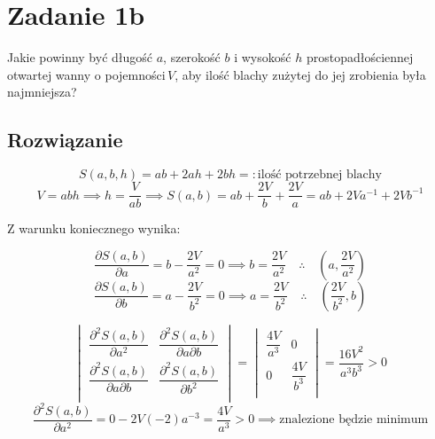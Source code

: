 \documentclass{article}
\newcommand{\partderiv}[2]{\frac{\partial #1}{\partial #2}}
\DeclareMathOperator{\?}{?}
\begin{document}
\section*{Zadanie 1b}
Jakie powinny być długość $a$, szerokość $b$ i wysokość $h$ prostopadłościennej
otwartej wanny o pojemności\,$V$, aby ilość blachy zużytej do jej zrobienia była
najmniejsza?

\subsection*{Rozwiązanie}

\begin{equation*}
   S(a,b,h) = ab + 2ah + 2bh =: \textrm{ilość potrzebnej blachy}
\end{equation*}
\begin{equation*}
   V = abh \implies h = \frac{V}{ab} \implies S(a,b) = ab + \frac{2V}{b} + \frac{2V}{a} = ab + 2Va^{-1} + 2Vb^{-1}
\end{equation*}

Z warunku koniecznego wynika:

\begin{equation} \label{a}
   \partderiv{S(a,b)}{a} = b - \frac{2V}{a^2} = 0 \implies b = \frac{2V}{a^2} \quad\therefore\quad \left( a, \frac{2V}{a^2} \right)
\end{equation}
\begin{equation} \label{b}
   \partderiv{S(a,b)}{b} = a - \frac{2V}{b^2} = 0 \implies a = \frac{2V}{b^2} \quad\therefore\quad \left( \frac{2V}{b^2}, b \right)
\end{equation}

\begin{equation*}
   \begin{vmatrix}
      \dfrac{\partial^2 S(a,b)}{\partial a^2} & \dfrac{\partial^2 S(a,b)}{\partial a \partial b} \\[1em]
      \dfrac{\partial^2 S(a,b)}{\partial a \partial b} & \dfrac{\partial^2 S(a,b)}{\partial b^2} \\
   \end{vmatrix}
   =
   \begin{vmatrix}
      \dfrac{4V}{a^3} & 0 \\[1em]
      0 & \dfrac{4V}{b^3} \\
   \end{vmatrix}
   = \frac{16V^2}{a^3 b^3} > 0
\end{equation*}
\begin{equation*}
   \frac{\partial^2 S(a,b)}{\partial a^2} = 0 - 2V(-2)a^{-3} = \frac{4V}{a^3} > 0 \implies \textrm{znalezione będzie minimum}
\end{equation*}
\end{document}
